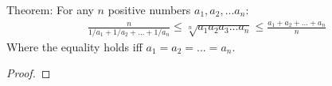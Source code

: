 \documentclass{article}
\begin{document}
Theorem: For any $n$ positive numbers $a_1, a_2, ... a_n$: 
\begin{align*}
\frac{n}{1/a_1 + 1/a_2 + ... + 1/a_n} \leq \sqrt[n]{a_1 a_2 a_3 ... a_n} \leq \frac{a_1 + a_2 + ... + a_n}{n}
\end{align*}
Where the equality holds iff $a_1 = a_2 = ... = a_n$.

\begin{proof}

\end{proof}
\end{document}

